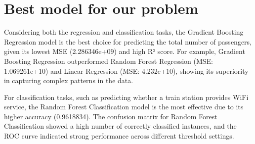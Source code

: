 \section{Best model for our problem}
Considering both the regression and classification tasks, the Gradient Boosting Regression model is the best choice for predicting the total number of passengers, given its lowest MSE (2.286346e+09) and high R² score. For example, Gradient Boosting Regression outperformed Random Forest Regression (MSE: 1.069261e+10) and Linear Regression (MSE: 4.232e+10), showing its superiority in capturing complex patterns in the data.

For classification tasks, such as predicting whether a train station provides WiFi service, the Random Forest Classification model is the most effective due to its higher accuracy (0.9618834). The confusion matrix for Random Forest Classification showed a high number of correctly classified instances, and the ROC curve indicated strong performance across different threshold settings.